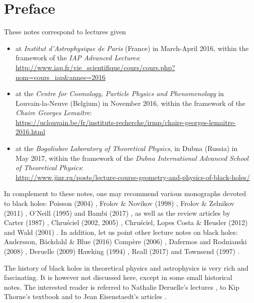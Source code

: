 \chapter*{Preface}

These notes correspond to lectures given
\begin{itemize}
\item at \emph{Institut d'Astrophysique de Paris} (France) in March-April 2016, within the
framework of the \emph{IAP Advanced Lectures}:\\
{\small\url{http://www.iap.fr/vie_scientifique/cours/cours.php?nom=cours_iap&annee=2016}}
\item at the \emph{Centre for Cosmology, Particle Physics and Phenomenology} in Louvain-la-Neuve
(Belgium) in November 2016, within the framework of the \emph{Chaire Georges Lemaître}:\\
{\small \url{https://uclouvain.be/fr/instituts-recherche/irmp/chaire-georges-lemaitre-2016.html}}
\item at the
\emph{Bogoliubov Laboratory of Theoretical Physics}, in Dubna (Russia) in May 2017,
within the framework of the \emph{Dubna International Advanced School of Theoretical Physics}:\\
{\small\url{http://www.jinr.ru/posts/lecture-course-geometry-and-physics-of-black-holes/}}
\end{itemize}

\vspace{2ex}

In complement to these notes, one may recommend various monographs
devoted to black holes: Poisson (2004) \cite{Poiss04}, Frolov \& Novikov (1998) \cite{FroloN98},
Frolov \& Zelnikov (2011) \cite{FroloZ11}, O'Neill (1995) \cite{ONeil95}
and Bambi (2017) \cite{Bambi17}, as well as the review
articles by Carter (1987) \cite{Carte87}, Chru\'sciel (2002, 2005) \cite{Chrus02, Chrus05},
Chru\'sciel, Lopes Costa \& Heusler (2012) \cite{ChrusLH12} and Wald (2001) \cite{Wald01}.
In addition, let us point other lecture notes on black holes:
Andersson, Bäckdahl \& Blue (2016) \cite{AnderBB16}
Compère (2006) \cite{Compe06},
Dafermos and Rodnianski (2008) \cite{DaferR13},  Deruelle (2009) \cite{Derue09}
Hawking (1994) \cite{Hawki94,HawkiP15}, Reall (2017) \cite{Reall16} and Townsend (1997) \cite{Towns97}.

The history of black holes in theoretical physics and astrophysics is
very rich and fascinating. It is however not discussed here, except in some
small historical notes. The interested
reader is referred to Nathalie Deruelle's lectures \cite{Derue09}, to Kip Thorne's
textbook \cite{Thorn94} and to Jean Eisenstaedt's articles \cite{Eisen82,Eisen93}.


